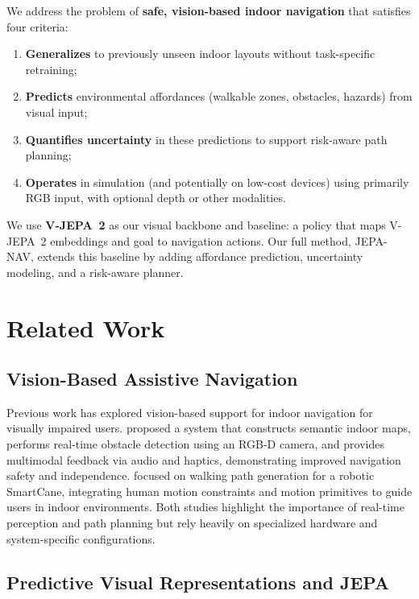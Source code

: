\documentclass{article}
\begin{document}
We address the problem of \textbf{safe, vision-based indoor navigation} that satisfies
four criteria:
\begin{enumerate}
  \item \textbf{Generalizes} to previously unseen indoor layouts without task-specific
        retraining;
  \item \textbf{Predicts} environmental affordances (walkable zones, obstacles, hazards)
        from visual input;
  \item \textbf{Quantifies uncertainty} in these predictions to support risk-aware path
        planning;
  \item \textbf{Operates} in simulation (and potentially on low-cost devices) using
        primarily RGB input, with optional depth or other modalities.
\end{enumerate}

We use \textbf{V-JEPA~2} as our visual backbone and baseline: a policy that maps
V-JEPA~2 embeddings and goal to navigation actions. Our full method, JEPA-NAV, extends
this baseline by adding affordance prediction, uncertainty modeling, and a risk-aware
planner.

\section{Related Work}

\subsection{Vision-Based Assistive Navigation}

Previous work has explored vision-based support for indoor navigation for visually
impaired users. \citet{li2018vision} proposed a system that constructs semantic indoor
maps, performs real-time obstacle detection using an RGB-D camera, and provides
multimodal feedback via audio and haptics, demonstrating improved navigation safety and
independence. \citet{na2024improving} focused on walking path generation for a robotic
SmartCane, integrating human motion constraints and motion primitives to guide users in
indoor environments. Both studies highlight the importance of real-time perception and
path planning but rely heavily on specialized hardware and system-specific
configurations.

\subsection{Predictive Visual Representations and JEPA}
\end{document}
